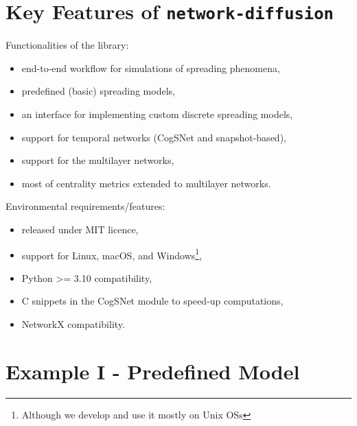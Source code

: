 \documentclass{beamer}
\begin{document}
\section{Key Features of \lstinline[style=py]{network-diffusion}}

\begin{frame}{\secname}
    Functionalities of the library:
    \vspace{1em}
    \begin{itemize}[<+->]
        \item end-to-end workflow for simulations of spreading phenomena,
        \item predefined (basic) spreading models,
        \item an interface for implementing custom discrete spreading models,
        \item support for temporal networks (CogSNet and snapshot-based),
        \item support for the multilayer networks,
        \item most of centrality metrics extended to multilayer networks.
    \end{itemize}
\end{frame}

\begin{frame}{\secname}
    Environmental requirements/features:
    \vspace{1em}
    \begin{itemize}
        \item released under MIT licence,
        \item support for Linux, macOS, and Windows\footnote{Although we develop and use it mostly on Unix OSs},
        \item Python >= 3.10 compatibility,
        \item C snippets in the CogSNet module to speed-up computations,
        \item NetworkX compatibility.
    \end{itemize}
\end{frame}

\section{Example I - Predefined Model}
\end{document}
